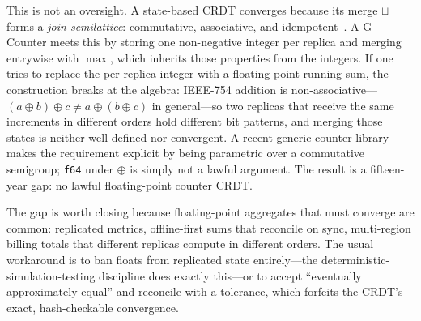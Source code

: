 \documentclass[11pt]{article}
\begin{document}
This is not an oversight. A state-based CRDT converges because its merge $\sqcup$ forms a
\emph{join-semilattice}: commutative, associative, and idempotent~\cite{shapiro}. A G-Counter meets
this by storing one non-negative integer per replica and merging entrywise with $\max$, which inherits
those properties from the integers. If one tries to replace the per-replica integer with a
floating-point running sum, the construction breaks at the algebra: IEEE-754 addition is
non-associative---$(a \oplus b) \oplus c \ne a \oplus (b \oplus c)$ in general---so two replicas that
receive the same increments in different orders hold different bit patterns, and merging those states is
neither well-defined nor convergent. A recent generic counter library makes the requirement explicit by
being parametric over a commutative semigroup; \texttt{f64} under $\oplus$ is simply not a lawful
argument. The result is a fifteen-year gap: no lawful floating-point counter CRDT.

The gap is worth closing because floating-point aggregates that must converge are common: replicated
metrics, offline-first sums that reconcile on sync, multi-region billing totals that different replicas
compute in different orders. The usual workaround is to ban floats from replicated state
entirely---the deterministic-simulation-testing discipline does exactly this---or to accept
``eventually approximately equal'' and reconcile with a tolerance, which forfeits the CRDT's exact,
hash-checkable convergence.
\end{document}
